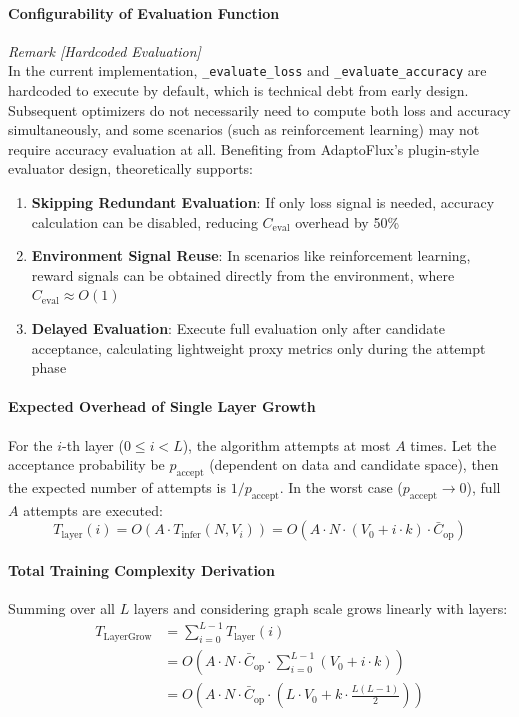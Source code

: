 \paragraph{Configurability of Evaluation Function}
\textit{Remark [Hardcoded Evaluation]} \\
In the current implementation, \texttt{\_evaluate\_loss} and \texttt{\_evaluate\_accuracy} are hardcoded to execute by default, which is technical debt from early design. Subsequent optimizers do not necessarily need to compute both loss and accuracy simultaneously, and some scenarios (such as reinforcement learning) may not require accuracy evaluation at all. Benefiting from AdaptoFlux's plugin-style evaluator design, theoretically supports:
\begin{enumerate}
    \item \textbf{Skipping Redundant Evaluation}: If only loss signal is needed, accuracy calculation can be disabled, reducing $C_{\mathrm{eval}}$ overhead by 50\%
    \item \textbf{Environment Signal Reuse}: In scenarios like reinforcement learning, reward signals can be obtained directly from the environment, where $C_{\mathrm{eval}} \approx O(1)$
    \item \textbf{Delayed Evaluation}: Execute full evaluation only after candidate acceptance, calculating lightweight proxy metrics only during the attempt phase
\end{enumerate}

\paragraph{Expected Overhead of Single Layer Growth}
For the $i$-th layer ($0 \leq i < L$), the algorithm attempts at most $A$ times. Let the acceptance probability be $p_{\mathrm{accept}}$ (dependent on data and candidate space), then the expected number of attempts is $1/p_{\mathrm{accept}}$. In the worst case ($p_{\mathrm{accept}} \to 0$), full $A$ attempts are executed:
\begin{equation}
    T_{\mathrm{layer}}(i) = O(A \cdot T_{\mathrm{infer}}(N, V_i)) = O(A \cdot N \cdot (V_0 + i \cdot k) \cdot \bar{C}_{\mathrm{op}})
\end{equation}

\paragraph{Total Training Complexity Derivation}
Summing over all $L$ layers and considering graph scale grows linearly with layers:
\begin{equation}
\begin{aligned}
    T_{\mathrm{LayerGrow}} &= \sum_{i=0}^{L-1} T_{\mathrm{layer}}(i) \\
    &= O\left( A \cdot N \cdot \bar{C}_{\mathrm{op}} \cdot \sum_{i=0}^{L-1} (V_0 + i \cdot k) \right) \\
    &= O\left( A \cdot N \cdot \bar{C}_{\mathrm{op}} \cdot (L \cdot V_0 + k \cdot \frac{L(L-1)}{2}) \right)
\end{aligned}
\end{equation}

